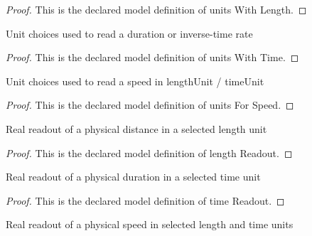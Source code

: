 \begin{proof}
  This is the declared model definition of units With Length.
\end{proof}
\begin{definition}
  \label{def:physics:phyx-mini-0923:phyxminiproblems-problemphyxmini0923-unitswithtime}
  Unit choices used to read a duration or inverse-time rate
\end{definition}
\begin{proof}
  This is the declared model definition of units With Time.
\end{proof}
\begin{definition}
  \label{def:physics:phyx-mini-0923:phyxminiproblems-problemphyxmini0923-unitsforspeed}
  Unit choices used to read a speed in lengthUnit / timeUnit
\end{definition}
\begin{proof}
  This is the declared model definition of units For Speed.
\end{proof}
\begin{definition}
  \label{def:physics:phyx-mini-0923:phyxminiproblems-problemphyxmini0923-lengthreadout}
  Real readout of a physical distance in a selected length unit
\end{definition}
\begin{proof}
  This is the declared model definition of length Readout.
\end{proof}
\begin{definition}
  \label{def:physics:phyx-mini-0923:phyxminiproblems-problemphyxmini0923-timereadout}
  Real readout of a physical duration in a selected time unit
\end{definition}
\begin{proof}
  This is the declared model definition of time Readout.
\end{proof}
\begin{definition}
  \label{def:physics:phyx-mini-0923:phyxminiproblems-problemphyxmini0923-speedreadout}
  Real readout of a physical speed in selected length and time units
\end{definition}
